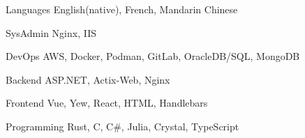 
\begin{cvskills}
   \cvskill
   {Languages} %
   {English(native), French, Mandarin Chinese}

   \cvskill
   {SysAdmin} %
   {Nginx, IIS}

   \cvskill
   {DevOps} %
   {AWS, Docker, Podman, GitLab, OracleDB/SQL, MongoDB}

   \cvskill
   {Backend} %
   {ASP.NET, Actix-Web, Nginx}

   \cvskill
   {Frontend} %
   {Vue, Yew, React, HTML, Handlebars}

   \cvskill
   {Programming} %
   {Rust, C, C\#, Julia, Crystal, TypeScript}

\end{cvskills}
